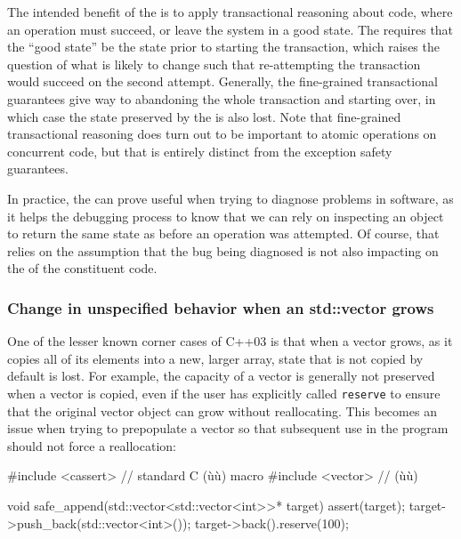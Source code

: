 The intended benefit of the 
is to apply transactional reasoning about code, where an operation must
succeed, or leave the system in a good state. The  requires that the ``good state'' be the state prior to
starting the transaction, which raises the question of what is likely to
change such that re-attempting the transaction would succeed on the
second attempt. Generally, the fine-grained transactional guarantees
give way to abandoning the whole transaction and starting over, in which
case the state preserved by the  is also lost.
Note that fine-grained transactional reasoning does turn out to be
important to atomic operations on concurrent code, but that is entirely
distinct from the exception safety guarantees.

In practice, the  can prove useful when trying
to diagnose problems in software, as it helps the debugging process to
know that we can rely on inspecting an object to return the same state
as before an operation was attempted. Of course, that relies on the
assumption that the bug being diagnosed is not also impacting on the
 of the constituent code.

\subsubsection[Change in unspecified behavior when an \lstinline!std::vector! grows]{Change in unspecified behavior when an {\SubsubsecCode std::vector} grows}\label{change-in-unspecified-behavior-when-an-std::vector-grows}

One of the lesser known corner cases of C++03 is that when a vector
grows, as it copies all of its elements into a new, larger array, state
that is not copied by default is lost. For example, the capacity of a
vector is generally not preserved when a vector is copied, even if the
user has explicitly called \lstinline!reserve! to ensure that the original
vector object can grow without reallocating. This becomes an issue when
trying to prepopulate a vector so that subsequent use in the program
should not force a reallocation:

\begin{emcppslisting}
#include <cassert>  // standard C (ù{}ù) macro
#include <vector>   // (ù{}ù)

void safe_append(std::vector<std::vector<int>>* target)
{
    assert(target);
    target->push_back(std::vector<int>());
    target->back().reserve(100);
}
\end{emcppslisting}
    

